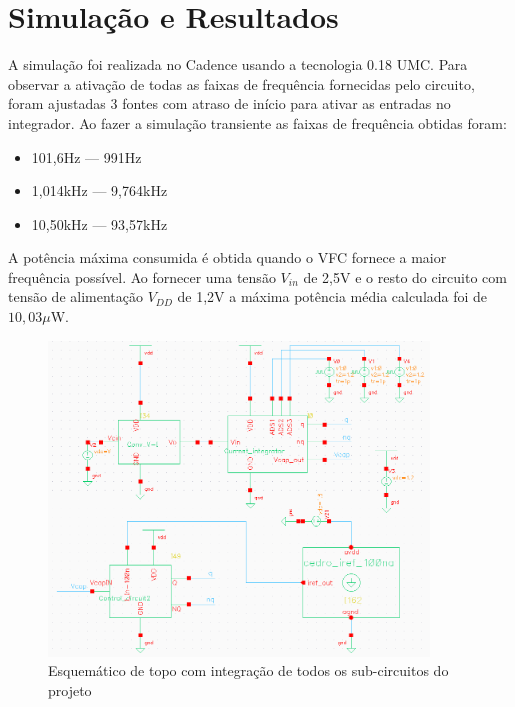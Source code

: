 \chapter[Simulação e Resultados]{Simulação e Resultados}

A simulação foi realizada no Cadence usando a tecnologia 0.18 UMC. Para observar a ativação de todas as faixas de frequência fornecidas pelo circuito, foram ajustadas 3 fontes com atraso de início para ativar as entradas no integrador. Ao fazer a simulação transiente as faixas de frequência obtidas foram:

\begin{itemize}
\item 101,6Hz	 \----	991Hz
\item 1,014kHz \----	9,764kHz
\item 10,50kHz \----	93,57kHz
\end{itemize}

A potência máxima consumida é obtida quando o VFC fornece a maior frequência possível. Ao fornecer uma tensão $V_{in}$ de 2,5V e o resto do circuito com tensão de alimentação $V_{DD}$ de 1,2V a máxima potência média calculada foi de $10,03\mu$W.


\begin{figure}[htb]
	\centering
	\includegraphics[width=0.9\textwidth]{figuras/imgs_jv/top.png}
	\caption{ Esquemático de topo com integração de todos os sub-circuitos do projeto }
	\label{fig16}
\end{figure}

